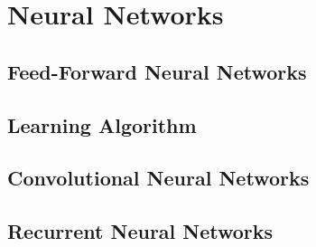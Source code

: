\section{Neural Networks}
\label{neural_networks}

\subsection{Feed-Forward Neural Networks}
\subsection{Learning Algorithm}
\subsection{Convolutional Neural Networks}
\subsection{Recurrent Neural Networks}